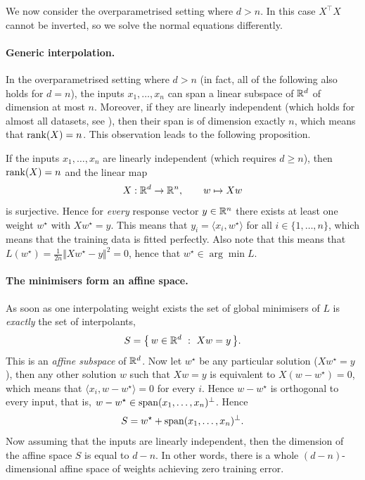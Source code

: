 We now consider the overparametrised setting where $d > n$. In this case $X^\top X$ cannot be inverted, so we solve the normal equations differently. 

\paragraph{Generic interpolation.}
In the overparametrised setting where $d > n$ (in fact, all of the following also holds for $d=n$), the inputs $x_1, \dots, x_n$ can span a linear subspace of $\mathbb{R}^d$ of dimension at most $n$. Moreover, if they are linearly independent (which holds for almost all datasets, see ), then their span is of dimension exactly $n$, which means that $\operatorname{rank}(X) = n$. This observation leads to the following proposition.

\begin{prop}
If the inputs $x_1, \dots, x_n$ are linearly independent (which requires $d \geq n$), then $\operatorname{rank}(X) = n$ and the linear map
\[
X : \mathbb{R}^d \to \mathbb{R}^n, \qquad w \mapsto Xw
\]
is surjective. Hence for \emph{every} response vector $y \in \mathbb{R}^n$ there exists at least one
weight $w^\star$ with $Xw^\star = y$. This means that $y_i = \langle x_i, w^\star \rangle$ for all $i \in \{1, \dots, n\}$, which means that the
training data is fitted perfectly. Also note that this means that $L(w^\star) = \tfrac{1}{2n}\Vert Xw^\star - y\Vert^2 = 0$, hence that $w^\star \in \arg\min L$.
\end{prop}






\paragraph{The minimisers form an affine space.}
As soon as one interpolating weight exists the set of global
minimisers of $L$ is \emph{exactly} the set of interpolants,
\[
S = \big\{\, w \in \mathbb{R}^d \ : \ Xw = y \,\big\} .
\]
This is an \emph{affine subspace} of $\mathbb{R}^d$. Now let $w^\star$ be any particular
solution ($X w^\star = y$), then any other solution $w$ such that $Xw = y$ is equivalent to $X (w - w^\star) = 0$, which means that $\langle x_i, w - w^\star \rangle = 0$ for every $i$. Hence $w - w^\star$ is orthogonal to every input, that is, $w - w^\star \in \operatorname{span}(x_1, \dots, x_n)^{\perp}$. Hence 
\[
S = w^\star + \operatorname{span}(x_1, \dots, x_n)^{\perp}.
\]
Now assuming that the inputs are linearly independent, then the dimension of the affine space $S$ is equal to $d-n$. In other words, there is a whole $(d-n)$-dimensional affine space of weights achieving
zero training error.


